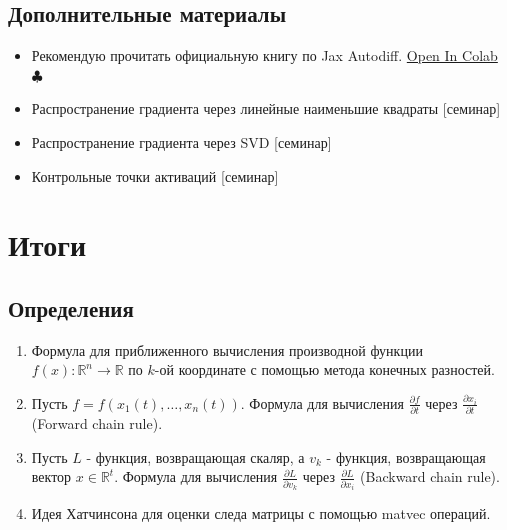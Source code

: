\documentclass[
  russian,
  letterpaper,
  DIV=11,
  numbers=noendperiod]{scrartcl}
\providecommand{\tightlist}{%
  \setlength{\itemsep}{0pt}\setlength{\parskip}{0pt}}
\begin{document}
\subsection{Дополнительные
материалы}\label{ux434ux43eux43fux43eux43bux43dux438ux442ux435ux43bux44cux43dux44bux435-ux43cux430ux442ux435ux440ux438ux430ux43bux44b}

\begin{itemize}
\tightlist
\item
  Рекомендую прочитать официальную книгу по Jax Autodiff.
  \href{https://colab.research.google.com/github/MerkulovDaniil/optim/blob/master/assets/Notebooks/Autograd_and_Jax.ipynb}{Open
  In Colab \(\clubsuit\)}
\item
  Распространение градиента через линейные наименьшие квадраты
  {[}семинар{]}
\item
  Распространение градиента через SVD {[}семинар{]}
\item
  Контрольные точки активаций {[}семинар{]}
\end{itemize}

\section{Итоги}\label{ux438ux442ux43eux433ux438}

\subsection{Определения}\label{ux43eux43fux440ux435ux434ux435ux43bux435ux43dux438ux44f}

\begin{enumerate}
\def\labelenumi{\arabic{enumi}.}
\tightlist
\item
  Формула для приближенного вычисления производной функции
  \(f(x): \mathbb{R}^n \to \mathbb{R}\) по \(k\)-ой координате с помощью
  метода конечных разностей.
\item
  Пусть \(f = f(x_1(t), \ldots, x_n(t))\). Формула для вычисления
  \(\frac{\partial f}{\partial t}\) через
  \(\frac{\partial x_i}{\partial t}\) (Forward chain rule).
\item
  Пусть \(L\) - функция, возвращающая скаляр, а \(v_k\) - функция,
  возвращающая вектор \(x \in \mathbb{R}^t\). Формула для вычисления
  \(\frac{\partial L}{\partial v_k}\) через
  \(\frac{\partial L}{\partial x_i}\) (Backward chain rule).
\item
  Идея Хатчинсона для оценки следа матрицы с помощью matvec операций.
\end{enumerate}
\end{document}

